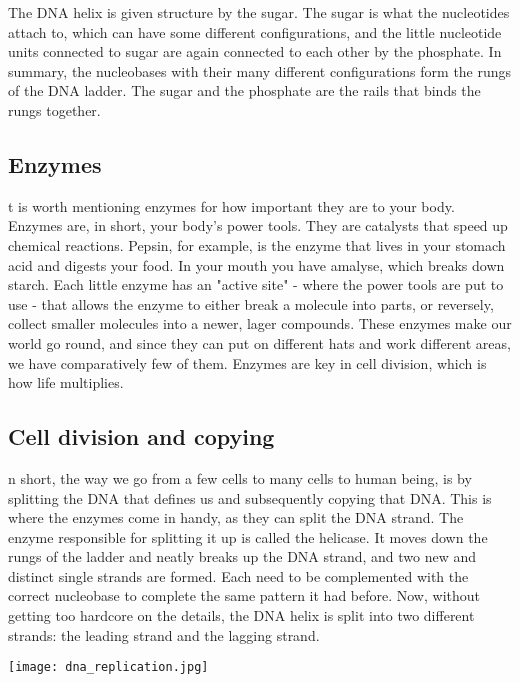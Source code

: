 The DNA helix is given structure by the sugar.
The sugar is what the nucleotides attach to, which can have some different configurations, and the little nucleotide units connected to sugar are again connected to each other by the phosphate.
In summary, the nucleobases with their many different configurations form the rungs of the DNA ladder.\cite{lewontin}
The sugar and the phosphate are the rails that binds the rungs together.

\subsection{Enzymes}
t is worth mentioning enzymes for how important they are to your body.
Enzymes are, in short, your body's power tools.\cite{hankgreen2}
They are catalysts that speed up chemical reactions.
Pepsin, for example, is the enzyme that lives in your stomach acid and digests your food.
In your mouth you have amalyse, which breaks down starch.
Each little enzyme has an "active site" - where the power tools are put to use - that allows the enzyme to either break a molecule into parts, or reversely, collect smaller molecules into a newer, lager compounds.
These enzymes make our world go round, and since they can put on different hats and work different areas, we have comparatively few of them.
Enzymes are key in cell division, which is how life multiplies. 

\subsection{Cell division and copying}
n short, the way we go from a few cells to many cells to human being, is by splitting the DNA that defines us and subsequently copying that DNA.
This is where the enzymes come in handy, as they can split the DNA strand.
The enzyme responsible for splitting it up is called the helicase.
It moves down the rungs of the ladder and neatly breaks up the DNA strand, and two new and distinct single strands are formed.
Each need to be complemented with the correct nucleobase to complete the same pattern it had before.
Now, without getting too hardcore on the details, the DNA helix is split into two different strands: the leading strand and the lagging strand.\cite{hankgreen}

\begin{center}
	\texttt{[image: dna\_replication.jpg]}
\end{center}


